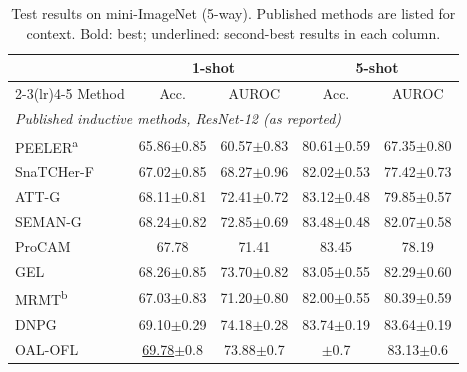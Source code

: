 \begin{table}[tbp]
\centering
\footnotesize
\setlength{\tabcolsep}{4pt}
\caption{Test results on mini-ImageNet (5-way). Published methods are listed for context. Bold: best; underlined: second-best results in each column.}\label{tab:mini}
\begin{tabular}{lcccc}
\toprule
 & \multicolumn{2}{c}{1-shot} & \multicolumn{2}{c}{5-shot} \\
\cmidrule(lr){2-3}\cmidrule(lr){4-5}
Method & Acc. & AUROC & Acc. & AUROC \\
\midrule
\multicolumn{5}{l}{\textit{Published inductive methods, ResNet-12 (as reported)}} \\
PEELER\textsuperscript{a}~\cite{liu2020peeler} & 65.86{\scriptsize$\pm$0.85} & 60.57{\scriptsize$\pm$0.83} & 80.61{\scriptsize$\pm$0.59} & 67.35{\scriptsize$\pm$0.80} \\
SnaTCHer-F~\cite{jeong2021snatcher} & 67.02{\scriptsize$\pm$0.85} & 68.27{\scriptsize$\pm$0.96} & 82.02{\scriptsize$\pm$0.53} & 77.42{\scriptsize$\pm$0.73} \\
ATT-G~\cite{huang2022tane} & 68.11{\scriptsize$\pm$0.81} & 72.41{\scriptsize$\pm$0.72} & 83.12{\scriptsize$\pm$0.48} & 79.85{\scriptsize$\pm$0.57} \\
SEMAN-G~\cite{huang2022tane} & 68.24{\scriptsize$\pm$0.82} & 72.85{\scriptsize$\pm$0.69} & 83.48{\scriptsize$\pm$0.48} & 82.07{\scriptsize$\pm$0.58} \\
ProCAM~\cite{song2022procam} & 67.78 & 71.41 & 83.45 & 78.19 \\
GEL~\cite{wang2023gel} & 68.26{\scriptsize$\pm$0.85} & 73.70{\scriptsize$\pm$0.82} & 83.05{\scriptsize$\pm$0.55} & 82.29{\scriptsize$\pm$0.60} \\
MRMT\textsuperscript{b}~\cite{che2023mrm} & 67.03{\scriptsize$\pm$0.83} & 71.20{\scriptsize$\pm$0.80} & 82.00{\scriptsize$\pm$0.55} & 80.39{\scriptsize$\pm$0.59} \\
DNPG~\cite{zhang2024dnpg} & 69.10{\scriptsize$\pm$0.29} & 74.18{\scriptsize$\pm$0.28} & 83.74{\scriptsize$\pm$0.19} & 83.64{\scriptsize$\pm$0.19} \\
OAL-OFL~\cite{kim2025oalofl} & \underline{69.78}{\scriptsize$\pm$0.8} & 73.88{\scriptsize$\pm$0.7} & \textbf{\boldmath 85.49}{\scriptsize$\pm$0.7} & 83.13{\scriptsize$\pm$0.6} \\

\end{tabular}
\end{table}
